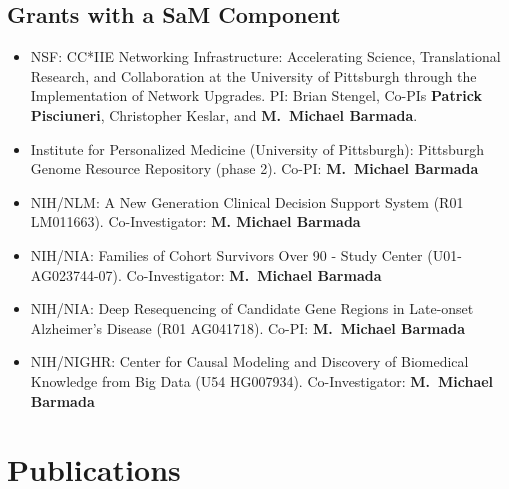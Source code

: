 \subsection{Grants with a SaM Component}
\begin{itemize}
    \item NSF: CC*IIE Networking Infrastructure: Accelerating Science,
          Translational Research, and Collaboration at the University of
          Pittsburgh through the Implementation of Network Upgrades.  PI:
          Brian Stengel, Co-PIs \textbf{Patrick Pisciuneri}, Christopher
          Keslar, and \textbf{M.\ Michael Barmada}.

    \item Institute for Personalized Medicine (University of Pittsburgh): Pittsburgh Genome Resource Repository (phase 2). Co-PI: \textbf{M.\ Michael Barmada}

    \item NIH/NLM: A New Generation Clinical Decision Support System (R01
          LM011663). Co-Investigator: \textbf{M. Michael Barmada}

    \item NIH/NIA: Families of Cohort Survivors Over 90 - Study Center
          (U01-AG023744-07). Co-Investigator: \textbf{M.\ Michael
          Barmada}

    \item NIH/NIA: Deep Resequencing of Candidate Gene Regions in Late-onset Alzheimer's Disease (R01 AG041718). Co-PI: \textbf{M.\ Michael
          Barmada}

    \item NIH/NIGHR: Center for Causal Modeling and Discovery of Biomedical Knowledge from Big Data (U54 HG007934). Co-Investigator: \textbf{M.\ Michael Barmada}

\end{itemize}


\section{Publications}


